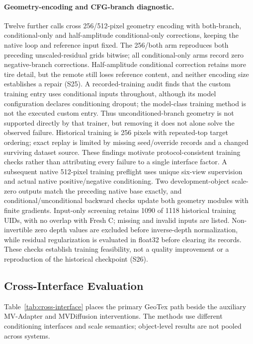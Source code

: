 \documentclass[times,twocolumn,final]{elsarticle}
\begin{document}
\paragraph{Geometry-encoding and CFG-branch diagnostic.}
Twelve further calls cross 256/512-pixel geometry encoding with both-branch, conditional-only and half-amplitude conditional-only corrections, keeping the native loop and reference input fixed. The 256/both arm reproduces both preceding unscaled-residual grids bitwise; all conditional-only arms record zero negative-branch corrections. Half-amplitude conditional correction retains more tire detail, but the remote still loses reference content, and neither encoding size establishes a repair (S25). A recorded-training audit finds that the custom training entry uses conditional inputs throughout, although its model configuration declares conditioning dropout; the model-class training method is not the executed custom entry. Thus unconditioned-branch geometry is not supported directly by that trainer, but removing it does not alone solve the observed failure. Historical training is 256 pixels with repeated-top target ordering; exact replay is limited by missing seed/override records and a changed surviving dataset source. These findings motivate protocol-consistent training checks rather than attributing every failure to a single interface factor. A subsequent native 512-pixel training preflight uses unique six-view supervision and actual native positive/negative conditioning. Two development-object scale-zero outputs match the preceding native base exactly, and conditional/unconditional backward checks update both geometry modules with finite gradients. Input-only screening retains 1090 of 1118 historical training UIDs, with no overlap with Fresh C; missing and invalid inputs are listed. Non-invertible zero depth values are excluded before inverse-depth normalization, while residual regularization is evaluated in float32 before clearing its records. These checks establish training feasibility, not a quality improvement or a reproduction of the historical checkpoint (S26).

\subsection{Cross-Interface Evaluation}
\label{subsec:cross-interface}

Table~\ref{tab:cross-interface} places the primary GeoTex path beside the auxiliary MV-Adapter and MVDiffusion interventions. The methods use different conditioning interfaces and scale semantics; object-level results are not pooled across systems.
\end{document}
